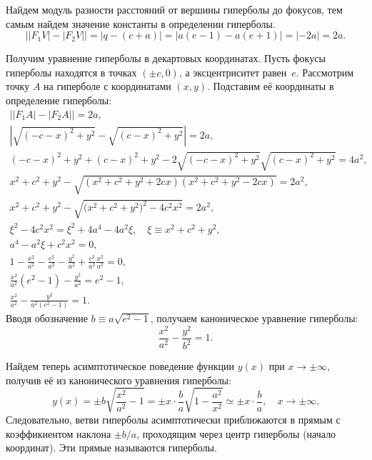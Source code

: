 Найдем модуль разности расстояний от вершины гиперболы до фокусов, тем самым найдем значение константы в определении гиперболы. 
\begin{equation*}
	\big||F_1 V| - |F_2 V|\big| = |q - (c + a)| = |a(e - 1) - a(e + 1)| = |-2a| = 2a.
\end{equation*}

Получим уравнение гиперболы в декартовых координатах. Пусть фокусы гиперболы находятся в точках $(\pm c, 0)$, а эксцентриситет равен~$e$. Рассмотрим точку $A$ на гиперболе с координатами $(x,y)$. Подставим её координаты в определение гиперболы:
\begin{gather*}
	\big| |F_1 A| - |F_2 A| \big| = 2a,\\
	\left|\sqrt{(-c - x)^2 + y^2} - \sqrt{(c - x)^2 + y^2} \right| = 2a,\\
	(-c - x)^2 + y^2 + (c - x)^2 + y^2 - 2\sqrt{(-c - x)^2 + y^2}\sqrt{(c - x)^2 + y^2} = 4a^2,\\
	x^2 + c^2 + y^2  - \sqrt{(x^2 + c^2 + y^2 + 2cx ) ( x^2 + c^2 + y^2 - 2cx )} = 2a^2,\\
	x^2 + c^2 + y^2 - \sqrt{\big(x^2 + c^2 + y^2\big)^2 - 4 c^2 x^2} = 2a^2,\\
	\xi^2 - 4 c^2 x^2 = \xi^2 + 4a^4 - 4a^2\xi, \quad \xi \equiv x^2 + c^2 + y^2,\\
	a^4 - a^2 \xi + c^2x^2 = 0,\\
	1 - \frac{x^2}{a^2} - \frac{c^2}{a^2} - \frac{y^2}{a^2} + \frac{c^2}{a^2} \frac{x^2}{a^2} = 0,\\
	\frac{x^2}{a^2} (e^2 - 1) - \frac{y^2}{a^2} = e^2 - 1,\\
	\frac{x^2}{a^2} - \frac{y^2}{a^2(e^2 - 1)} = 1.
\end{gather*}
Вводя обозначение $b \equiv a \sqrt{e^2 - 1}$, получаем каноническое уравнение гиперболы:
\begin{equation}
	\frac{x^2}{a^2}-\frac{y^2}{b^2}=1.
\end{equation}

Найдем теперь асимптотическое поведение функции $y(x)$ при $x \rightarrow \pm \infty$, получив её из канонического уравнения гиперболы:
\begin{equation*}
	 y(x) = \pm b\sqrt{\frac{x^2}{a^2} - 1} =  \pm x \cdot \frac{b}{a}\sqrt{1 - \frac{a^2}{x^2}} \simeq \pm x \cdot \frac{b}{a}, \quad x \rightarrow \pm \infty.
\end{equation*}
Следовательно, ветви гиперболы асимптотически приближаются в прямым с коэффикиентом наклона $\pm b/a$, проходящим через центр гиперболы (начало координат). Эти прямые называются  гиперболы.

